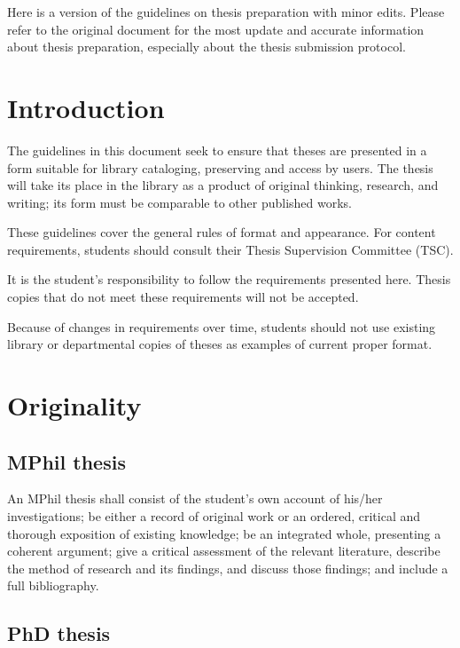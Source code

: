 
Here is a version of the guidelines on thesis preparation with minor edits. Please refer to the original document \citep{ust_thesis_guidelines} for the most update and accurate information about thesis preparation, especially about the thesis submission protocol.

\section{Introduction}

The guidelines in this document seek to ensure that theses are presented in a form suitable for library cataloging, preserving and access by users. The thesis will take its place in the library as a product of original thinking, research, and writing; its form must be comparable to other published works.

These guidelines cover the general rules of format and appearance. For content requirements, students should consult their Thesis Supervision Committee (TSC).

It is the student's responsibility to follow the requirements presented here. Thesis copies that do not meet these requirements will not be accepted.

Because of changes in requirements over time, students should not use existing library or departmental copies of theses as examples of current proper format.

\section{Originality}
\subsection{MPhil thesis}

An MPhil thesis shall consist of the student's own account of his/her investigations; be either a record of original work or an ordered, critical and thorough exposition of existing knowledge; be an integrated whole, presenting a coherent argument; give a critical assessment of the relevant literature, describe the method of research and its findings, and discuss those findings; and include a full bibliography.

\subsection{PhD thesis}

